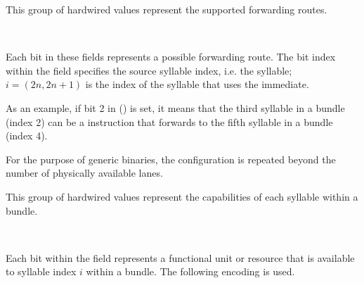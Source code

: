 This group of hardwired values represent the supported  forwarding
routes.

\reset{****************}
\  %
\reset{****************}

Each bit in these fields represents a possible  forwarding route. 
The bit index within the field specifies the source syllable index, i.e. the 
 syllable; $i = \left ( 2n, 2n+1 \right )$ is the index of the 
syllable that uses the immediate.

As an example, if bit 2 in  () is set, it means that 
the third syllable in a bundle (index 2) can be a  instruction that 
forwards to the fifth syllable in a bundle (index 4).

For the purpose of generic binaries, the configuration is repeated beyond the
number of physically available lanes.


This group of hardwired values represent the capabilities of each syllable
within a bundle.

\  %
\  %
\  %

Each bit within the field represents a functional unit or resource that is
available to syllable index $i$ within a bundle. The following encoding is used.

